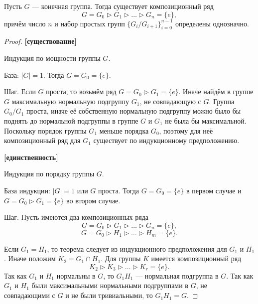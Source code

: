 
\begin{theorem}
	Пусть $ G $ --- конечная группа. Тогда существует композиционный ряд
	$$ G = G_0 \rhd G_1 \rhd \ldots \rhd G_n = \{e\}, $$
	причём число $ n $ и набор простых групп $ \{G_i/G_{i + 1}\}_{i = 0}^{n - 1} $ определены однозначно.
\end{theorem}

\begin{proof}
	\hfil
	
	\textbf{[существование]}
	
	Индукция по мощности группы $ G $.
	
	База: $ |G| = 1 $. Тогда $ G = G_0 = \{e\} $.
	
	Шаг. Если $ G $ проста, то возьмём ряд $ G = G_0 \rhd G_1 = \{e\} $.
	Иначе найдём в группе $ G $ максимальную нормальную подгруппу $ G_1 $, не совпадающую с $ G $.
	Группа $ G_0/G_1 $ проста, иначе её собственную нормальную подгруппу 
	можно было бы поднять до нормальной подгруппы в группе $ G $
	и $ G_1 $ не была бы максимальной.
	Поскольку порядок группы $ G_1 $ меньше порядка $ G_0 $,
	поэтому для неё композиционный ряд для $ G_1 $ существует по индукционному предположению. 
	
	\textbf{[единственность]}
	
	Индукция по порядку группы $ G $.
	
	База индукции: $ |G| = 1 $  или $ G $ проста. Тогда $ G = G_0 = \{e\} $ в первом случае и $ G = G_0 \rhd G_1 = \{e\} $ во втором случае.
	
	Шаг. Пусть имеются два композиционных ряда
	$$ G = G_0 \rhd G_1 \rhd \ldots \rhd G_n = \{e\}, $$
	$$ G = G_0 \rhd H_1 \rhd \ldots \rhd H_m = \{e\}. $$ 
	
	Если $ G_1 = H_1 $, то теорема следует из индукционного предположения для $ G_1 $ и $ H_1 $.
	Иначе положим $ K_2 = G_1 \cap H_1 $.
	Для группы $ K $ имеется композиционный ряд
	$$ K_2 \rhd K_3 \rhd \ldots \rhd K_r = \{e\}. $$
	Так как $ G_1 $ и $ H_1 $ нормальны в $ G $, то $ G_1H_1 $ --- нормальная подгруппа в $ G $.
	Так как $ G_1 $ и $ H_1 $ были максимальными нормальными подгруппами в $ G $,
	не совпадающими с $ G $ и не были тривиальными, то $ G_1H_1 = G $.
	

\end{proof}
